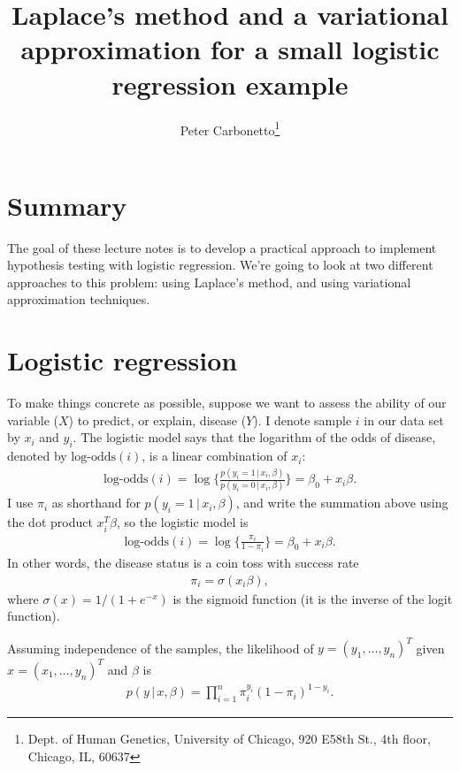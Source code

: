 \documentclass[final]{siamltex}
\title{Laplace's method and a variational approximation for a small
  logistic regression example}
\author{Peter Carbonetto\thanks{Dept. of Human Genetics, 
University of Chicago, 920 E58th St., 4th floor, Chicago, IL, 60637}}
\newcommand{\logodds}{\mbox{log-odds}}
\begin{document}
\maketitle

\section*{Summary}

The goal of these lecture notes is to develop a practical approach to
implement hypothesis testing with logistic regression. We're going to
look at two different approaches to this problem: using Laplace's
method, and using variational approximation techniques.

\section*{Logistic regression}

To make things concrete as possible, suppose we want to assess the
ability of our variable ($X$) to predict, or explain, disease ($Y$). I
denote sample $i$ in our data set by $x_i$ and $y_i$. The logistic
model says that the logarithm of the odds of disease, denoted by
$\logodds(i)$, is a linear combination of $x_i$:
\begin{align*}
\logodds(i) = \log\bigg\{\frac{p(y_i = 1 \,|\, x_i, \beta)}
         {p(y_i = 0 \,|\, x_i, \beta)}\bigg\} 
= \beta_0 + x_i \beta.
\end{align*}
I use $\pi_i$ as shorthand for
$p(y_i = 1 \,|\, x_i, \beta)$, and write the summation above using the
dot product $x_i^T\beta$, so the logistic model is
\begin{align*}
\logodds(i) = \log\bigg\{\frac{\pi_i}{1-\pi_i}\bigg\} = \beta_0 + x_i\beta.
\end{align*}
In other words, the disease status is a coin toss with success rate
\begin{align*}
\pi_i = \sigma(x_i\beta),
\end{align*}
where $\sigma(x) = 1/(1 + e^{-x})$ is the sigmoid function (it is the
inverse of the logit function).

Assuming independence of the samples, the likelihood of $y = (y_1,
\ldots, y_n)^T$ given $x = (x_1, \ldots, y_n)^T$ and $\beta$ is
\begin{align*}
p(y \,|\, x, \beta) = \prod_{i=1}^n \pi_i^{y_i} (1-\pi_i)^{1-y_i}.
\end{align*}
\end{document}
